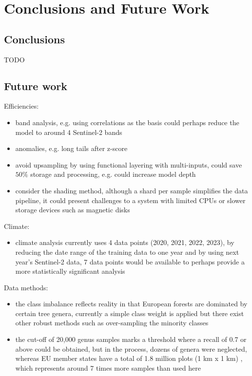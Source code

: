 \chapter{Conclusions and Future Work}
\label{chapter:conclusion}
\section{Conclusions}
TODO 

\section{Future work}

Efficiencies:
\begin{itemize}
    \item band analysis, e.g. using correlations as the basis could perhaps reduce the model to around 4 Sentinel-2 bands
    \item anomalies, e.g. long tails after z-score
    \item avoid upsampling by using functional layering with multi-inputs, could save $50\%$ storage and  processing, e.g. could increase model depth
    \item consider the shading method, although a shard per sample simplifies the data pipeline, it could present challenges to a system with limited CPUs or slower storage devices such as magnetic disks
\end{itemize}

Climate:
\begin{itemize}
    \item climate analysis currently uses 4 data points (2020, 2021, 2022, 2023), by reducing the date range of the training data to one year and by using next year's Sentinel-2 data, 7 data points would be available to perhaps provide a more statistically significant analysis
\end{itemize}

Data methods:
\begin{itemize}
    \item the class imbalance reflects reality in that European forests are dominated by certain tree genera, currently a simple class weight is applied but there exist other robust methods such as over-sampling the minority classes
    \item the cut-off of 20,000 genus samples marks a threshold where a recall of 0.7 or above could be obtained, but in the process, dozens of genera were neglected, whereas EU member states have a total of 1.8 million plots (1 km x 1 km) \cite{eu_forest_report}, which represents around 7 times more samples than used here
\end{itemize}

